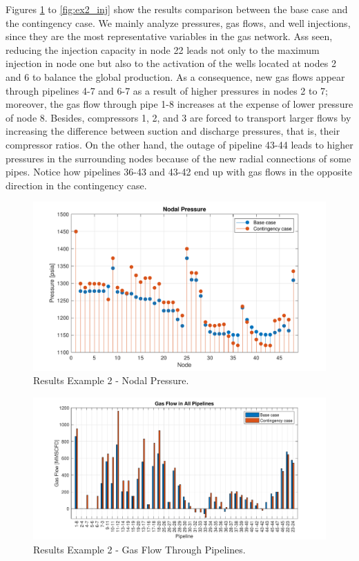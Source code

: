 Figures \ref{fig:ex2_pressure} to \ref{fig:ex2_inj} show the results comparison between the base case and the contingency case. We mainly analyze pressures, gas flows, and well injections, since they are the most representative variables in the gas network. Ass seen, reducing the injection capacity in node 22 leads not only to the maximum injection in node one but also to the activation of the wells located at nodes 2 and 6 to balance the global production. As a consequence, new gas flows appear through pipelines 4-7 and 6-7 as a result of higher pressures in nodes 2 to 7; moreover, the gas flow through pipe 1-8 increases at the expense of lower pressure of node 8. Besides, compressors 1, 2, and 3 are forced to transport larger flows by increasing the difference between suction and discharge pressures, that is, their compressor ratios. On the other hand, the outage of pipeline 43-44 leads to higher pressures in the surrounding nodes because of the new radial connections of some pipes. Notice how pipelines 36-43 and 43-42 end up with gas flows in the opposite direction in the contingency case.

\begin{figure}[H]
\centering	
\includegraphics[scale=0.8]{Figures/ex2_pressure}
\caption{Results Example 2 - Nodal Pressure.}
\label{fig:ex2_pressure}
\end{figure}

\begin{figure}[H]
\includegraphics[scale=0.75]{Figures/ex2_fgo}
\caption{Results Example 2 - Gas Flow Through Pipelines.}
\label{fig:ex2_fgo}
\end{figure}

